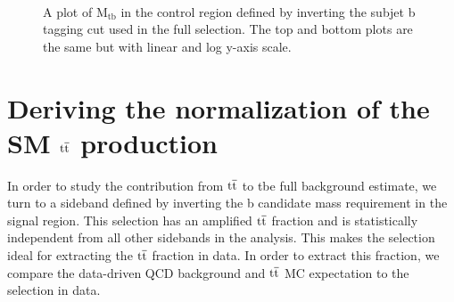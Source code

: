 \begin{figure}[Htcb]
\centering
{}\\
\caption{A plot of $\mathrm{M_{tb}}$ in the control region defined by inverting the subjet b tagging cut used in the full selection.  The top and bottom plots are the same but with linear and log y-axis scale.}
\label{figs:NewMtbSB3}
\end{figure}

\section{Deriving the normalization of the SM $\mathrm{t\overline{t}}$ production}
\label{sec:ttbarsideband}
In order to study the contribution from $\mathrm{t\overline{t}}$ to tbe full background estimate, we turn to a sideband defined by inverting the b candidate mass requirement in the signal region.
This selection has an amplified $\mathrm{t\overline{t}}$ fraction and is statistically independent from all other sidebands in the analysis.  
This makes the selection ideal for extracting the $\mathrm{t\overline{t}}$ fraction in data.  
In order to extract this fraction, we compare the data-driven QCD background and $\mathrm{t\overline{t}}$ MC expectation to the selection in data.  

